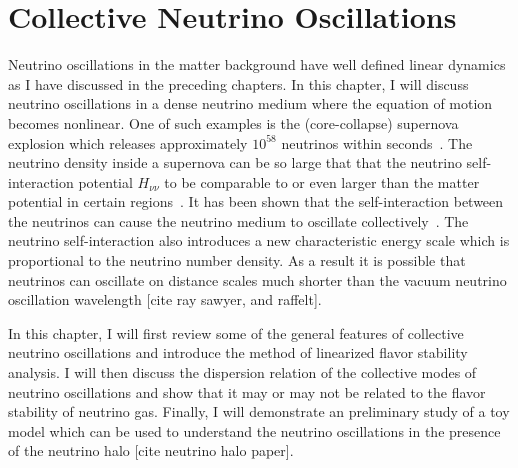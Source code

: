 
\chapter{\label{chap:collective}Collective Neutrino Oscillations}

Neutrino oscillations in the matter background have well defined linear dynamics as I  have discussed in the preceding chapters. In this chapter, I will discuss neutrino oscillations in a dense neutrino medium where the equation of motion becomes nonlinear. 
One of such examples is the (core-collapse) supernova explosion which releases approximately $10^{58}$ neutrinos within seconds~\cite{Bahcall1987}. The neutrino density inside a supernova can be so large that that the neutrino self-interaction potential $H_{\nu\nu}$ to be comparable to or even larger than the matter potential in certain regions~\cite{Flowers1976a}. It has been shown that the self-interaction between the neutrinos can cause the neutrino medium to oscillate collectively~\cite{Duan2010, Duan2006}. The neutrino self-interaction also introduces a new characteristic energy scale which is proportional to the neutrino number density. As a result it is possible that neutrinos can oscillate on distance scales much shorter than the vacuum neutrino oscillation wavelength [cite ray sawyer, and raffelt].

In this chapter, I will first review some of the general features of collective neutrino oscillations and introduce the method of linearized flavor stability analysis. I will then discuss the dispersion relation of the collective modes of neutrino oscillations and show that it may or may not be related to the flavor stability of neutrino gas. Finally, I will demonstrate an preliminary study of a toy model which can be used to understand the neutrino oscillations in the presence of the neutrino halo [cite neutrino halo paper].


